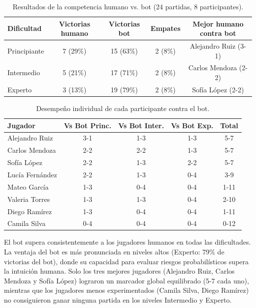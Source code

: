 \documentclass[12pt,a4paper]{article}
\begin{document}
\begin{table}[H]
\centering
\caption{Resultados de la competencia humano vs. bot (24 partidas, 8 participantes).}
\label{tab:humano_vs_bot}
\begin{tabular}{lcccc}
\toprule
\textbf{Dificultad} & \textbf{Victorias humano} & \textbf{Victorias bot} & \textbf{Empates} & \textbf{Mejor humano contra bot} \\
\midrule
Principiante & 7 (29\%) & 15 (63\%) & 2 (8\%)  & Alejandro Ruiz (3-1) \\
Intermedio   & 5 (21\%) & 17 (71\%) & 2 (8\%)  & Carlos Mendoza (2-2) \\
Experto      & 3 (13\%) & 19 (79\%) & 2 (8\%)  & Sofía López (2-2) \\
\bottomrule
\end{tabular}
\end{table}

\begin{table}[H]
\centering
\caption{Desempeño individual de cada participante contra el bot.}
\label{tab:humano_vs_bot_detalle}
\begin{tabular}{lcccc}
\toprule
\textbf{Jugador} & \textbf{Vs Bot Princ.} & \textbf{Vs Bot Inter.} & \textbf{Vs Bot Exp.} & \textbf{Total} \\
\midrule
Alejandro Ruiz   & 3-1 & 1-3 & 1-3 & 5-7  \\
Carlos Mendoza   & 2-2 & 2-2 & 1-3 & 5-7  \\
Sofía López      & 2-2 & 1-3 & 2-2 & 5-7  \\
Lucía Fernández  & 2-2 & 1-3 & 0-4 & 3-9  \\
Mateo García     & 1-3 & 0-4 & 0-4 & 1-11 \\
Valeria Torres   & 1-3 & 1-3 & 0-4 & 2-10 \\
Diego Ramírez    & 1-3 & 0-4 & 0-4 & 1-11 \\
Camila Silva     & 0-4 & 0-4 & 0-4 & 0-12 \\
\bottomrule
\end{tabular}
\end{table}

El bot supera consistentemente a los jugadores humanos en todas las dificultades. La ventaja del bot es más pronunciada en niveles altos (Experto: 79\% de victorias del bot), donde su capacidad para evaluar riesgos probabilísticos supera la intuición humana. Solo los tres mejores jugadores (Alejandro Ruiz, Carlos Mendoza y Sofía López) lograron un marcador global equilibrado (5-7 cada uno), mientras que los jugadores menos experimentados (Camila Silva, Diego Ramírez) no consiguieron ganar ninguna partida en los niveles Intermedio y Experto.
\end{document}
